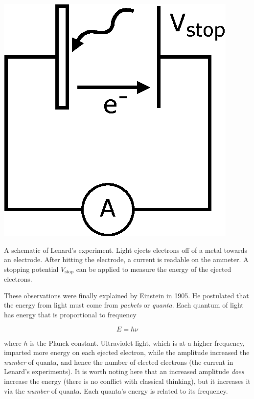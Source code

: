 \begin{marginfigure}[-12cm]
	\includegraphics{images/chap1_photoelectric.eps}
	\caption{A schematic of Lenard's experiment. Light ejects electrons off of a metal towards an electrode. After hitting the electrode, a current is readable on the ammeter. A stopping potential $V_{\text{stop}} $ can be applied to measure the energy of the ejected electrons.} 
\end{marginfigure}

These observations were finally explained by Einstein in 1905. He postulated that the energy from light must come from \textit{packets} or \textit{quanta}. Each quantum of light has energy that is proportional to frequency 

\begin{equation}
E = h\nu 	
\end{equation}

where $ h $ is the Planck constant. Ultraviolet light, which is at a higher frequency, imparted more energy on each ejected electron, while the amplitude increased the \textit{number} of quanta, and hence the number of elected electrons (the current in Lenard's experiments). It is worth noting here that an increased amplitude \textit{does} increase the energy (there is no conflict with classical thinking), but it increases it via the \textit{number} of quanta. Each quanta's energy is related to its frequency.

